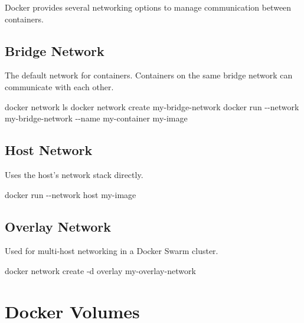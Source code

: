 \documentclass[
  letterpaper,
  DIV=11,
  numbers=noendperiod]{scrreprt}
\newenvironment{Shaded}{\begin{snugshade}}{\end{snugshade}}
\newcommand{\AttributeTok}[1]{\textcolor[rgb]{0.40,0.45,0.13}{#1}}
\newcommand{\ExtensionTok}[1]{\textcolor[rgb]{0.00,0.23,0.31}{#1}}
\newcommand{\NormalTok}[1]{\textcolor[rgb]{0.00,0.23,0.31}{#1}}
\begin{document}
Docker provides several networking options to manage communication
between containers.

\subsection{Bridge Network}\label{bridge-network}

The default network for containers. Containers on the same bridge
network can communicate with each other.

\begin{Shaded}
\begin{Highlighting}[]
\ExtensionTok{docker}\NormalTok{ network ls}
\ExtensionTok{docker}\NormalTok{ network create my{-}bridge{-}network}
\ExtensionTok{docker}\NormalTok{ run }\AttributeTok{{-}{-}network}\NormalTok{ my{-}bridge{-}network }\AttributeTok{{-}{-}name}\NormalTok{ my{-}container my{-}image}
\end{Highlighting}
\end{Shaded}

\subsection{Host Network}\label{host-network}

Uses the host's network stack directly.

\begin{Shaded}
\begin{Highlighting}[]
\ExtensionTok{docker}\NormalTok{ run }\AttributeTok{{-}{-}network}\NormalTok{ host my{-}image}
\end{Highlighting}
\end{Shaded}

\subsection{Overlay Network}\label{overlay-network}

Used for multi-host networking in a Docker Swarm cluster.

\begin{Shaded}
\begin{Highlighting}[]
\ExtensionTok{docker}\NormalTok{ network create }\AttributeTok{{-}d}\NormalTok{ overlay my{-}overlay{-}network}
\end{Highlighting}
\end{Shaded}

\section{Docker Volumes}\label{docker-volumes}
\end{document}
